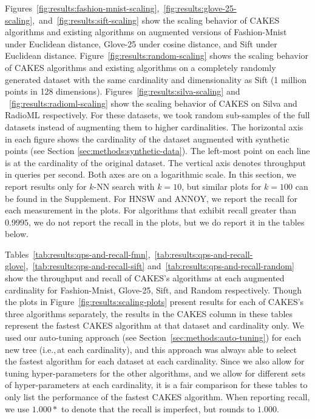 Figures~\ref{fig:results:fashion-mnist-scaling},~\ref{fig:results:glove-25-scaling},~and~\ref{fig:results:sift-scaling} show the scaling behavior of CAKES algorithms and existing algorithms on augmented versions of Fashion-Mnist under Euclidean distance,
Glove-25 under cosine distance, and
Sift under Euclidean distance.
Figure~\ref{fig:results:random-scaling} shows the scaling behavior of CAKES algorithms and existing algorithms on a completely randomly generated dataset with the same cardinality and dimensionality as Sift (1 million points in 128 dimensions).
Figures~\ref{fig:results:silva-scaling} and ~\ref{fig:results:radioml-scaling} show the scaling behavior of CAKES on Silva and RadioML respectively.
For these datasets, we took random sub-samples of the full datasets instead of augmenting them to higher cardinalities.
The horizontal axis in each figure shows the cardinality of the dataset augmented with synthetic points (see Section \ref{sec:methods:synthetic-data}).
The left-most point on each line is at the cardinality of the original dataset.
The vertical axis denotes throughput in queries per second.
Both axes are on a logarithmic scale.
In this section, we report results only for $k$-NN search with $k = 10$, but similar plots for $k = 100$ can be found in the Supplement.
For HNSW and ANNOY, we report the recall for each measurement in the plots. For algorithms that exhibit recall greater than $0.9995$, we do not report the recall in the plots, but we do report it in the tables below.

Tables~\ref{tab:results:qps-and-recall-fmn},~\ref{tab:results:qps-and-recall-glove},~\ref{tab:results:qps-and-recall-sift} and~\ref{tab:results:qps-and-recall-random} show the throughput and recall of CAKES's algorithms at each augmented cardinality for Fashion-Mnist, Glove-25, Sift, and Random respectively.
Though the plots in Figure~\ref{fig:results:scaling-plots} present results for each of CAKES's three algorithms separately, the results in the CAKES column in these tables represent the fastest CAKES algorithm at that dataset and cardinality only.
We used our auto-tuning approach (see Section~\ref{sec:methods:auto-tuning}) for each new tree (i.e.,\,at each cardinality), and this approach was always able to select the fastest algorithm for each dataset at each cardinality.
Since we also allow for tuning hyper-parameters for the other algorithms, and we allow for different sets of hyper-parameters at each cardinality, it is a fair comparison for these tables to only list the performance of the fastest CAKES algorithm.
When reporting recall, we use $1.000*$ to denote that the recall is imperfect, but rounds to $1.000$.


